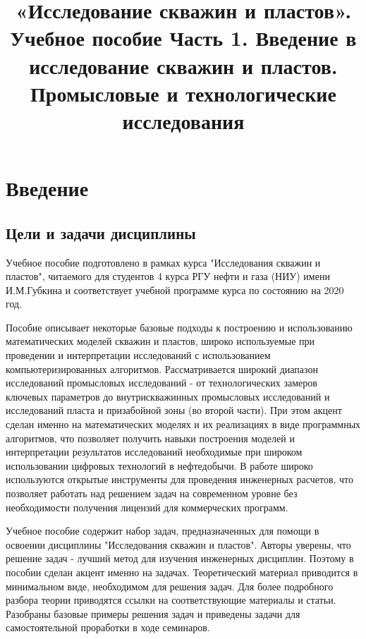\documentclass{memoir}
\begin{document}
\title{«Исследование скважин и пластов». Учебное пособие  Часть 1. Введение в исследование скважин и пластов. Промысловые и технологические исследования}

\maketitle

\tableofcontents{}
\chapter{Введение}

\section{Цели и задачи дисциплины}
Учебное пособие подготовлено в рамках курса "Исследования скважин и пластов", читаемого для студентов 4 курса РГУ нефти и газа (НИУ) имени И.М.Губкина и соответствует учебной программе курса по состоянию на 2020 год. 

Пособие описывает некоторые базовые подходы к построению и использованию математических моделей скважин и пластов, широко используемые при проведении и интерпретации исследований с использованием компьютеризированных алгоритмов. Рассматривается широкий диапазон исследований промысловых исследований - от технологических замеров ключевых параметров до внутрискважинных промысловых исследований и исследований пласта и призабойной зоны (во второй части). При этом акцент сделан именно на математических моделях и их реализациях в виде программных алгоритмов, что позволяет получить навыки построения моделей и интерпретации результатов исследований необходимые при широком использовании цифровых технологий в нефтедобычи. В работе широко используются открытые инструменты для проведения инженерных расчетов, что позволяет работать над решением задач на современном уровне без необходимости получения лицензий для коммерческих программ. 

Учебное пособие содержит набор задач, предназначенных для помощи в освоении дисциплины "Исследования скважин и пластов". Авторы уверены, что решение задач - лучший метод для изучения инженерных дисциплин. Поэтому в пособии сделан акцент именно на задачах. Теоретический материал приводится в минимальном виде, необходимом для решения задач. Для более подробного разбора теории приводятся ссылки на соответствующие материалы и статьи. Разобраны базовые примеры решения задач и приведены задачи для самостоятельной проработки в ходе семинаров. 
\end{document}
